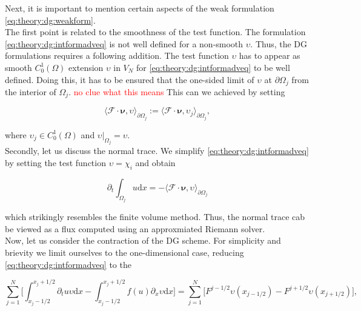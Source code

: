 \documentclass[11pt,a4paper,headinclude=true,DIV=14,BCOR=8mm,chapterprefix,listof=totoc,twoside,openright,abstracton]{scrbook}
\begin{document}
Next, it is important to mention certain aspects of the weak formulation \ref{eq:theory:dg:weakform}. \\

The first point is related to the smoothness of the test function. The formulation \ref{eq:theory:dg:intformadveq} is not well defined for a non-smooth $\upsilon$. Thus, the DG formulations requires a following addition. The test function $\upsilon$ has to appear as smooth $C_0 ^1(\Omega)$ extension $\upsilon$ in $V_N$ for \ref{eq:theory:dg:intformadveq} to be well defined. Doing this, it has to be ensured that the one-sided limit of $\upsilon$ at $\partial\Omega_j$ from the interior of $\Omega_j$. \textcolor{red}{no clue what this means} This can we achieved by setting

\begin{equation}
    \langle\boldsymbol{\mathcal{F}}\cdot\boldsymbol{\nu},\upsilon\rangle_{\partial\Omega_j} := \langle\boldsymbol{\mathcal{F}}\cdot\boldsymbol{\nu},\upsilon_j\rangle_{\partial\Omega_j},
\end{equation}

where $\upsilon_j \in C_0 ^1 (\Omega)$ and $\upsilon|_{\Omega_j}=\upsilon$. \\

Secondly, let us discuss the normal trace. We simplify \ref{eq:theory:dg:intformadveq} by setting the test function $\upsilon = \chi_i$ and obtain

\begin{equation}
    \partial_t\int_{\Omega_j}u\text{d}x = - \langle\boldsymbol{\mathcal{F}}\cdot\boldsymbol{\nu},\upsilon\rangle_{\partial\Omega_j}
\end{equation}

which strikingly resembles the finite volume method. Thus, the normal trace cab be viewed as a flux computed using an approxmiated Riemann solver. \\

Now, let us consider the contraction of the DG scheme. For simplicity and brievity we limit ourselves to the one-dimensional case, reducing \ref{eq:theory:dg:intformadveq} to the 

\begin{equation}
    \sum_{j=1}^{N}\Bigg[\int_{x_j - 1/2}^{x_j +1/2}\partial_t u \upsilon \text{d}x - \int_{x_j - 1/2}^{x_j +1/2}f(u)\partial_x\upsilon\text{d}x\Bigg] = \sum_{j=1}^{N}\big[F^{j-1/2}\upsilon(x_{j-1/2}) - F^{j+1/2}\upsilon(x_{j+1/2})\big],
\end{equation}
\end{document}
